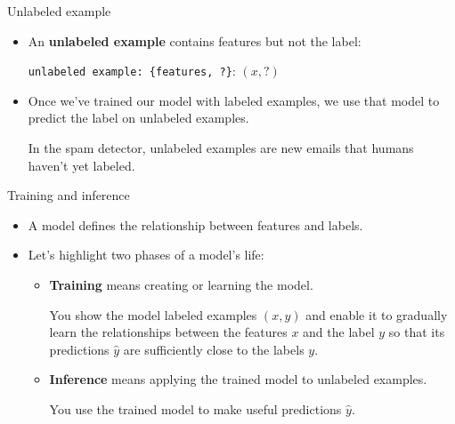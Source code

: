 \documentclass{beamer}
\begin{document}

\begin{frame}{Unlabeled example}

\begin{itemize}
\item 
An {\bf unlabeled example} contains features but not the label:

\medskip
\texttt{unlabeled example: \{features, ?\}}: $(x, ?)$

\medskip
\item Once we've trained our model with labeled examples, we use that model to predict the label on unlabeled examples. 

\medskip
In the spam detector, unlabeled examples are new emails that humans haven't yet labeled.
\end{itemize}

\end{frame}



\begin{frame}{Training and inference}
\begin{itemize}

\medskip
\item A model defines the relationship between features and labels. 
    
\medskip
\item 
Let's highlight two phases of a model's life:

\medskip
\begin{itemize}
\item {\bf Training} means creating or learning the model. 

\medskip
You show the model labeled examples $(x, y)$ and enable it to gradually learn the relationships between the features $x$ and the label $y$ so that its predictions $\hat{y}$ are sufficiently close to the labels $y$.
        
\medskip
\item {\bf Inference} means applying the trained model to unlabeled examples. 

\medskip
You use the trained model to make useful predictions $\hat{y}$.
\end{itemize}
\end{itemize}

\end{frame}

\end{document}
